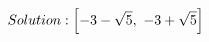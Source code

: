 \documentclass[preview]{standalone}
\begin{document}
\begin{align*}
\special{dvisvgm:raw <g id='unique000'>}Solution: \left[ -3 - \sqrt{5}, \  -3 + \sqrt{5}\right]\special{dvisvgm:raw </g>}
\end{align*}
\end{document}
